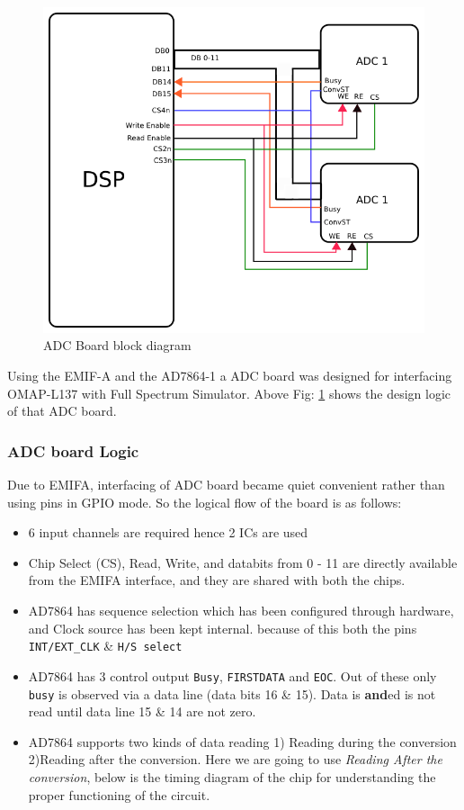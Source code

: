 \begin{appendix}
\begin{figure}[ht]
	\centering
	\includegraphics[scale=0.4]{fig/ADC_board.png}
	\caption{ADC Board block diagram}
	\label{fig:adc_board}
\end{figure}
Using the EMIF-A and the AD7864-1 a ADC board was designed for interfacing OMAP-L137 with Full Spectrum Simulator. Above Fig: \ref{fig:adc_board} shows the design logic of that ADC board. 


\subsubsection{ADC board Logic}
Due to EMIFA, interfacing of ADC board became quiet convenient rather than using pins in GPIO mode. So the logical flow of the board is as follows:

\begin{itemize}
	\item 6 input channels are required hence 2 ICs are used
	\item Chip Select (CS), Read, Write, and databits from 0 - 11 are directly available from the EMIFA interface, and they are shared with both the chips.
	\item AD7864 has sequence selection which has been configured through hardware, and Clock source has been kept internal. because of this both the pins \texttt{INT/EXT\_CLK} \& \texttt{H/S select}
	\item AD7864 has 3 control output \texttt{Busy}, \texttt{FIRSTDATA} and \texttt{EOC}. Out of these only \texttt{busy} is observed via a data line (data bits 16 \& 15). Data is \textbf{and}ed is not read until data line 15 \& 14 are not zero.
	\item AD7864 supports two kinds of data reading 1) Reading during the conversion 2)Reading after the conversion. Here we are going to use \textit{Reading After the conversion}, below is the timing diagram of the chip for understanding the proper functioning of the circuit.
\end{itemize}



\end{appendix}

